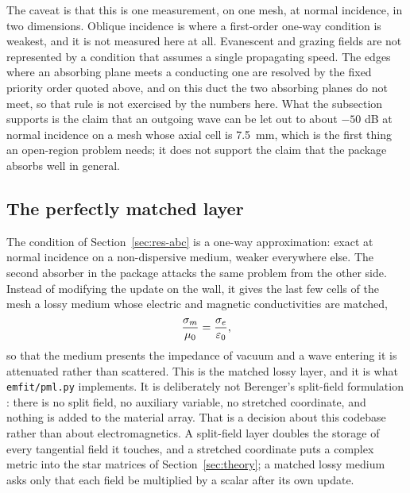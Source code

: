 The caveat is that this is one measurement, on one mesh, at normal incidence, in two dimensions. Oblique
incidence is where a first-order one-way condition is weakest, and it is not measured here at all. Evanescent
and grazing fields are not represented by a condition that assumes a single propagating speed. The edges where
an absorbing plane meets a conducting one are resolved by the fixed priority order quoted above, and on this
duct the two absorbing planes do not meet, so that rule is not exercised by the numbers here. What the
subsection supports is the claim that an outgoing wave can be let out to about $-50$ dB at normal incidence on a
mesh whose axial cell is \SI{7.5}{mm}, which is the first thing an open-region problem needs; it does not support
the claim that the package absorbs well in general.

\subsection{The perfectly matched layer}
\label{sec:res-pml}

The condition of Section~\ref{sec:res-abc} is a one-way approximation: exact at normal incidence on a
non-dispersive medium, weaker everywhere else. The second absorber in the package attacks the same problem from
the other side. Instead of modifying the update on the wall, it gives the last few cells of the mesh a lossy
medium whose electric and magnetic conductivities are matched,
\begin{equation}
  \frac{\sigma_m}{\mu_0} = \frac{\sigma_e}{\varepsilon_0},
  \label{eq:pml-match}
\end{equation}
so that the medium presents the impedance of vacuum and a wave entering it is attenuated rather than scattered.
This is the matched lossy layer, and it is what \texttt{emfit/pml.py} implements. It is deliberately not
Berenger's split-field formulation \cite{berenger1994}: there is no split field, no auxiliary variable, no
stretched coordinate, and nothing is added to the material array. That is a decision about this codebase rather
than about electromagnetics. A split-field layer doubles the storage of every tangential field it touches, and
a stretched coordinate puts a complex metric into the star matrices of Section~\ref{sec:theory}; a matched
lossy medium asks only that each field be multiplied by a scalar after its own update.

